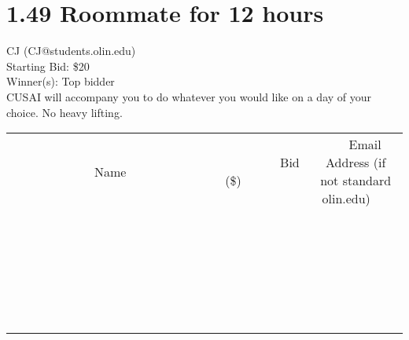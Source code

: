 \documentclass[11pt]{article}
\begin{document}
\section*{1.49 Roommate for 12 hours}
CJ (CJ@students.olin.edu) \\
Starting Bid: \$20 \\
Winner(s): 
Top bidder \\
CUSAI will accompany you to do whatever you would like on a day of your choice. No heavy lifting. \\[6ex]
\begin{tabular}{c c c}
~~~~~~~~~~~~~Name~~~~~~~~~~~~~ & ~~~~~~~~~Bid (\$)~~~~~~~~~ & ~~~Email Address (if not standard olin.edu)~~~ \\
 & & \\
\hline
 & & \\
\hline
 & & \\
\hline
 & & \\
\hline
 & & \\
\hline
 & & \\
\hline
 & & \\
\hline
 & & \\
\hline
 & & \\
\hline
 & & \\
\hline
 & & \\
\hline
 & & \\
\hline
 & & \\
\hline
 & & \\
\hline
 & & \\
\hline
 & & \\
\hline
 & & \\
\hline
 & & \\
\hline
 & & \\
\hline
 & & \\
\hline
 & & \\
\hline
 & & \\
\hline
 & & \\
\hline
 & & \\
\hline
 & & \\
\hline
 & & \\
\hline
\end{tabular}
\clearpage
\end{document}
